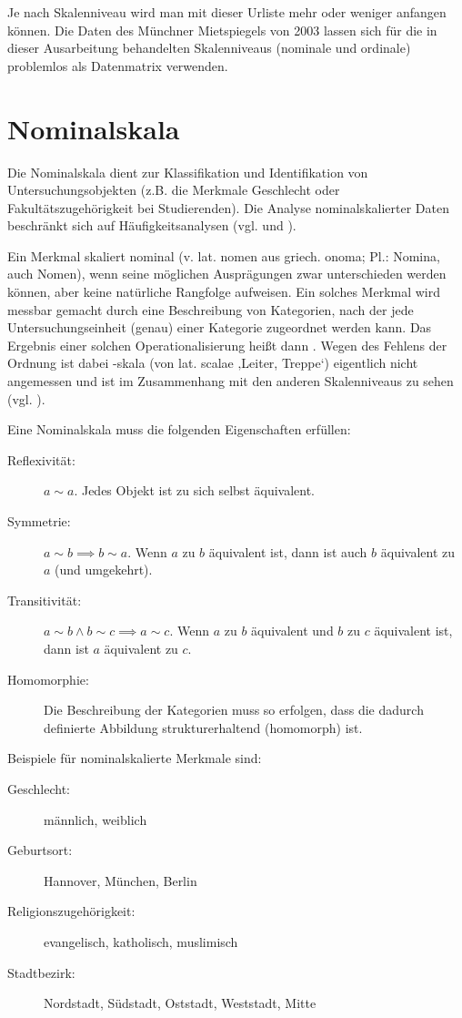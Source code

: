 Je nach Skalenniveau wird man mit dieser Urliste mehr oder weniger anfangen können. Die
Daten des Münchner Mietspiegels von 2003 lassen sich für die in dieser Ausarbeitung
behandelten Skalenniveaus (nominale und ordinale) problemlos als Datenmatrix verwenden.


\section{Nominalskala}

Die Nominalskala dient zur Klassifikation und Identifikation von Untersuchungsobjekten (z.B.
die Merkmale Geschlecht oder Fakultätszugehörigkeit bei Studierenden). Die Analyse nominalskalierter
Daten beschränkt sich auf Häufigkeitsanalysen (vgl.  und
).

Ein Merkmal skaliert nominal (v. lat. nomen  aus griech. onoma; Pl.: Nomina, auch Nomen), 
wenn seine möglichen Ausprägungen zwar unterschieden werden können, aber keine natürliche Rangfolge aufweisen.
Ein solches Merkmal wird messbar gemacht durch eine Beschreibung von Kategorien,
nach der jede Untersuchungseinheit (genau) einer Kategorie zugeordnet werden kann. 
Das Ergebnis einer solchen Operationalisierung heißt dann . 
Wegen des Fehlens der Ordnung ist dabei -skala (von lat. scalae ‚Leiter, Treppe‘) eigentlich nicht
angemessen und ist im Zusammenhang mit den anderen Skalenniveaus zu sehen (vgl.
).

Eine Nominalskala muss die folgenden Eigenschaften erfüllen:
\begin{description}
\item[Reflexivität:] $a \sim a$. Jedes Objekt ist zu sich selbst äquivalent.
\item[Symmetrie:] $a \sim b \implies b \sim a$. Wenn $a$ zu $b$ äquivalent ist, dann ist auch $b$ äquivalent zu $a$ (und umgekehrt).
\item[Transitivität:] $a \sim b \land b \sim c \implies a \sim c$. Wenn $a$ zu $b$ äquivalent und $b$ zu $c$ äquivalent ist, dann ist $a$ äquivalent zu $c$.
\item[Homomorphie:] Die Beschreibung der Kategorien muss so erfolgen, dass die dadurch definierte Abbildung strukturerhaltend (homomorph) ist.
\end{description}

Beispiele für nominalskalierte Merkmale sind:
\begin{description}
  \item[Geschlecht:] männlich, weiblich
  \item[Geburtsort:] Hannover, München, Berlin
  \item[Religionszugehörigkeit:] evangelisch, katholisch, muslimisch
  \item[Stadtbezirk:] Nordstadt, Südstadt, Oststadt, Weststadt, Mitte
\end{description}



